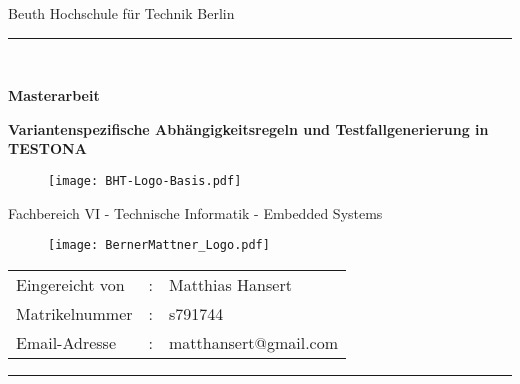 \begin{titlepage}
	\begin{center}
		\Large
		Beuth Hochschule für Technik Berlin
		\textcolor{darkBHT}{\rule{\textwidth}{0.2cm}} \\
		\vspace{2 cm}
		
		\Large		
		\textbf{Masterarbeit}
		
		\huge
		\textbf{Variantenspezifische Abhängigkeitsregeln und Testfallgenerierung in TESTONA\\}

		\vspace{2 cm}
		
		\begin{figure}[htbp]
			\centering 
			\texttt{[image: BHT-Logo-Basis.pdf]}  
		\end{figure}

\Large
Fachbereich VI - Technische Informatik - Embedded Systems
		
		\vspace{1cm}		

		\begin{figure}[htbp]
			\centering 
			\texttt{[image: BernerMattner\_Logo.pdf]}  
		\end{figure}		
		
		\vspace{2cm}
		

		\begin{tabular}{lll}
			Eingereicht von&: &Matthias Hansert \\
			Matrikelnummer&:  &s791744\\
			Email-Adresse &: &matthansert@gmail.com\\
		\end{tabular}
		
		\date{\today}
		
	\end{center}
	\vfill
	\textcolor{darkBHT}{\rule{\textwidth}{0.2cm}}
	\normalsize
	
	\newpage
\end{titlepage}